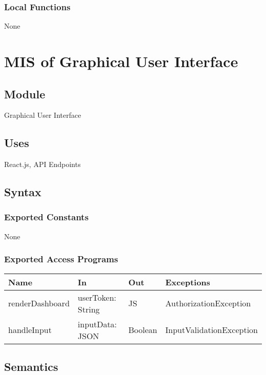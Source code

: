 \documentclass[12pt, titlepage]{article}
\begin{document}
\subsubsection{Local Functions}
None

\section{MIS of Graphical User Interface} \label{Graphical User Interfae}

\subsection{Module}
Graphical User Interface

\subsection{Uses}
React.js, API Endpoints

\subsection{Syntax}

\subsubsection{Exported Constants}
None

\subsubsection{Exported Access Programs}

\begin{center}
\begin{tabular}{p{4cm} p{4cm} p{2cm} p{4cm}}
\hline
\textbf{Name} & \textbf{In} & \textbf{Out} & \textbf{Exceptions} \\
\hline
renderDashboard & userToken: String & JS & AuthorizationException \\
handleInput & inputData: JSON & Boolean & InputValidationException \\
\hline
\end{tabular}
\end{center}

\subsection{Semantics}

\end{document}
